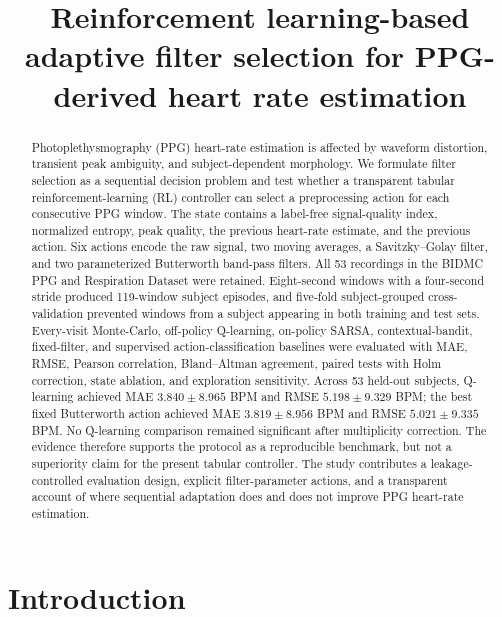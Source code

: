 \documentclass{elektr}
\title{Reinforcement learning-based adaptive filter selection for PPG-derived heart rate estimation}
\author[Anonymous]{}
\begin{document}
\maketitle

\begin{abstract}
Photoplethysmography (PPG) heart-rate estimation is affected by waveform distortion, transient peak ambiguity, and subject-dependent morphology. We formulate filter selection as a sequential decision problem and test whether a transparent tabular reinforcement-learning (RL) controller can select a preprocessing action for each consecutive PPG window. The state contains a label-free signal-quality index, normalized entropy, peak quality, the previous heart-rate estimate, and the previous action. Six actions encode the raw signal, two moving averages, a Savitzky--Golay filter, and two parameterized Butterworth band-pass filters. All 53 recordings in the BIDMC PPG and Respiration Dataset were retained. Eight-second windows with a four-second stride produced 119-window subject episodes, and five-fold subject-grouped cross-validation prevented windows from a subject appearing in both training and test sets. Every-visit Monte-Carlo, off-policy Q-learning, on-policy SARSA, contextual-bandit, fixed-filter, and supervised action-classification baselines were evaluated with MAE, RMSE, Pearson correlation, Bland--Altman agreement, paired tests with Holm correction, state ablation, and exploration sensitivity. Across 53 held-out subjects, Q-learning achieved MAE $3.840\pm8.965$ BPM and RMSE $5.198\pm9.329$ BPM; the best fixed Butterworth action achieved MAE $3.819\pm8.956$ BPM and RMSE $5.021\pm9.335$ BPM. No Q-learning comparison remained significant after multiplicity correction. The evidence therefore supports the protocol as a reproducible benchmark, but not a superiority claim for the present tabular controller. The study contributes a leakage-controlled evaluation design, explicit filter-parameter actions, and a transparent account of where sequential adaptation does and does not improve PPG heart-rate estimation.

\end{abstract}

\section{Introduction}
\end{document}
